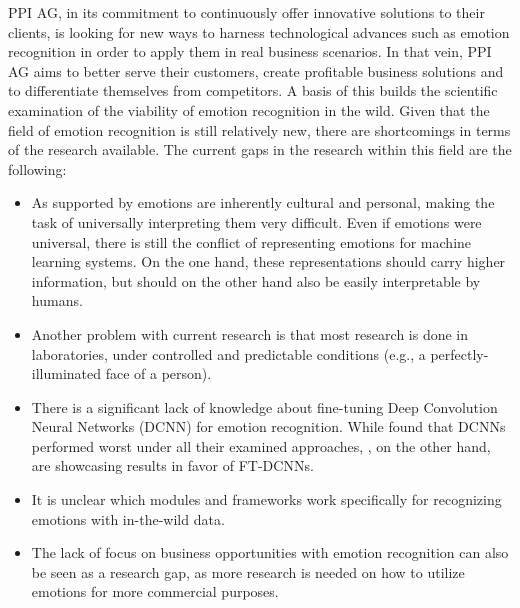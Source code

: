 \newline\newline
PPI AG, in its commitment to continuously offer innovative solutions to their clients, is looking for new ways to harness technological advances such as emotion recognition in order to apply them in real business scenarios. In that vein, PPI AG aims to better serve their customers, create profitable business solutions and to differentiate themselves from competitors. A basis of this builds the scientific examination of the viability of emotion recognition in the wild. Given that the field of emotion recognition is still relatively new, there are shortcomings in terms of the research available.
\newline\newline
The current gaps in the research within this field are the following:\newline
\begin{itemize}
    \item As supported by \citet{Salah:2018:VideoBasedER} emotions are inherently cultural and personal, making the task of universally interpreting them very difficult. Even if emotions were universal, there is still the conflict of representing emotions for machine learning systems. On the one hand, these representations should carry higher information, but should on the other hand also be easily interpretable by humans.
    \item Another problem with current research is that most research is done in laboratories, under controlled and predictable conditions (e.g., a perfectly-illuminated face of a person).
    \item There is a significant lack of knowledge about fine-tuning Deep Convolution Neural Networks (DCNN) for emotion recognition. While \citet{Kossaifi:2017:AFEW-VADatabase} found that DCNNs performed worst under all their examined approaches, \citet{Handrich:2020:SimultaneousPredVA}, on the other hand, are showcasing results in favor of FT-DCNNs.
    \item It is unclear which modules and frameworks work specifically for recognizing emotions with in-the-wild data.
    \item The lack of focus on business opportunities with emotion recognition can also be seen as a research gap, as more research is needed on how to utilize emotions for more commercial purposes.
\end{itemize}

